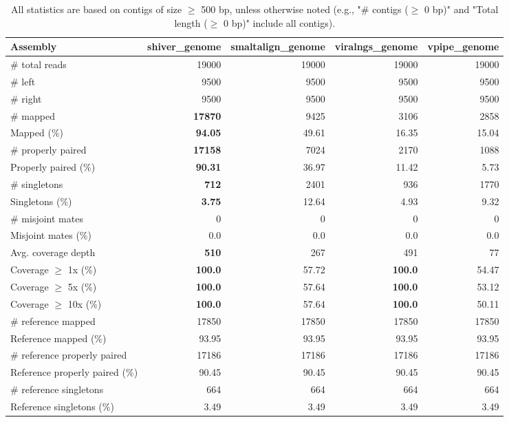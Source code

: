 \documentclass[12pt,a4paper]{article}
\begin{document}
\begin{table}[ht]
\begin{center}
\caption{All statistics are based on contigs of size $\geq$ 500 bp, unless otherwise noted (e.g., "\# contigs ($\geq$ 0 bp)" and "Total length ($\geq$ 0 bp)" include all contigs).}
\begin{tabular}{|l*{4}{|r}|}
\hline
Assembly & shiver\_genome & smaltalign\_genome & viralngs\_genome & vpipe\_genome \\ \hline
\# total reads & 19000 & 19000 & 19000 & 19000 \\ \hline
\# left & 9500 & 9500 & 9500 & 9500 \\ \hline
\# right & 9500 & 9500 & 9500 & 9500 \\ \hline
\# mapped & {\bf 17870} & 9425 & 3106 & 2858 \\ \hline
Mapped (\%) & {\bf 94.05} & 49.61 & 16.35 & 15.04 \\ \hline
\# properly paired & {\bf 17158} & 7024 & 2170 & 1088 \\ \hline
Properly paired (\%) & {\bf 90.31} & 36.97 & 11.42 & 5.73 \\ \hline
\# singletons & {\bf 712} & 2401 & 936 & 1770 \\ \hline
Singletons (\%) & {\bf 3.75} & 12.64 & 4.93 & 9.32 \\ \hline
\# misjoint mates & 0 & 0 & 0 & 0 \\ \hline
Misjoint mates (\%) & 0.0 & 0.0 & 0.0 & 0.0 \\ \hline
Avg. coverage depth & {\bf 510} & 267 & 491 & 77 \\ \hline
Coverage $\geq$ 1x (\%) & {\bf 100.0} & 57.72 & {\bf 100.0} & 54.47 \\ \hline
Coverage $\geq$ 5x (\%) & {\bf 100.0} & 57.64 & {\bf 100.0} & 53.12 \\ \hline
Coverage $\geq$ 10x (\%) & {\bf 100.0} & 57.64 & {\bf 100.0} & 50.11 \\ \hline
\# reference mapped & 17850 & 17850 & 17850 & 17850 \\ \hline
Reference mapped (\%) & 93.95 & 93.95 & 93.95 & 93.95 \\ \hline
\# reference properly paired & 17186 & 17186 & 17186 & 17186 \\ \hline
Reference properly paired (\%) & 90.45 & 90.45 & 90.45 & 90.45 \\ \hline
\# reference singletons & 664 & 664 & 664 & 664 \\ \hline
Reference singletons (\%) & 3.49 & 3.49 & 3.49 & 3.49 \\ \hline

\end{tabular}
\end{center}
\end{table}
\end{document}

